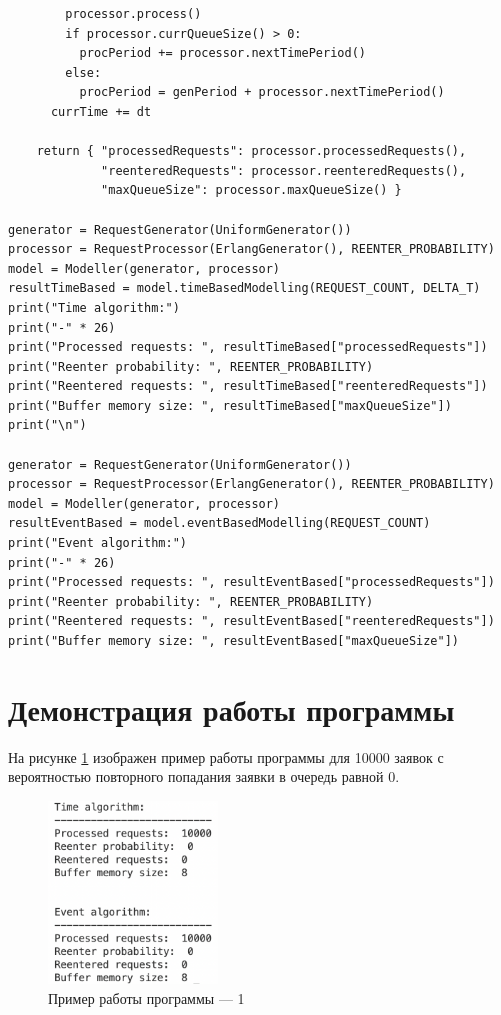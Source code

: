 \documentclass[12pt]{report}
\begin{document}
\begin{lstlisting}
        processor.process()
        if processor.currQueueSize() > 0:
          procPeriod += processor.nextTimePeriod()
        else:
          procPeriod = genPeriod + processor.nextTimePeriod()
      currTime += dt

    return { "processedRequests": processor.processedRequests(),
             "reenteredRequests": processor.reenteredRequests(),
             "maxQueueSize": processor.maxQueueSize() }

generator = RequestGenerator(UniformGenerator())
processor = RequestProcessor(ErlangGenerator(), REENTER_PROBABILITY)
model = Modeller(generator, processor)
resultTimeBased = model.timeBasedModelling(REQUEST_COUNT, DELTA_T)
print("Time algorithm:")
print("-" * 26)
print("Processed requests: ", resultTimeBased["processedRequests"])
print("Reenter probability: ", REENTER_PROBABILITY)
print("Reentered requests: ", resultTimeBased["reenteredRequests"])
print("Buffer memory size: ", resultTimeBased["maxQueueSize"])
print("\n")

generator = RequestGenerator(UniformGenerator())
processor = RequestProcessor(ErlangGenerator(), REENTER_PROBABILITY)
model = Modeller(generator, processor)
resultEventBased = model.eventBasedModelling(REQUEST_COUNT)
print("Event algorithm:")
print("-" * 26)
print("Processed requests: ", resultEventBased["processedRequests"])
print("Reenter probability: ", REENTER_PROBABILITY)
print("Reentered requests: ", resultEventBased["reenteredRequests"])
print("Buffer memory size: ", resultEventBased["maxQueueSize"])
\end{lstlisting}


\clearpage
\section*{Демонстрация работы программы}
На рисунке \ref{fig:pic1} изображен пример работы программы для 10000 заявок с вероятностью повторного попадания заявки в очередь равной 0.

\begin{figure}[h!btp]
	\centering
	\includegraphics[width=0.4\textwidth]{inc/pic1.png}
	\caption{Пример работы программы --- 1}
	\label{fig:pic1}	
\end{figure}
\end{document}
